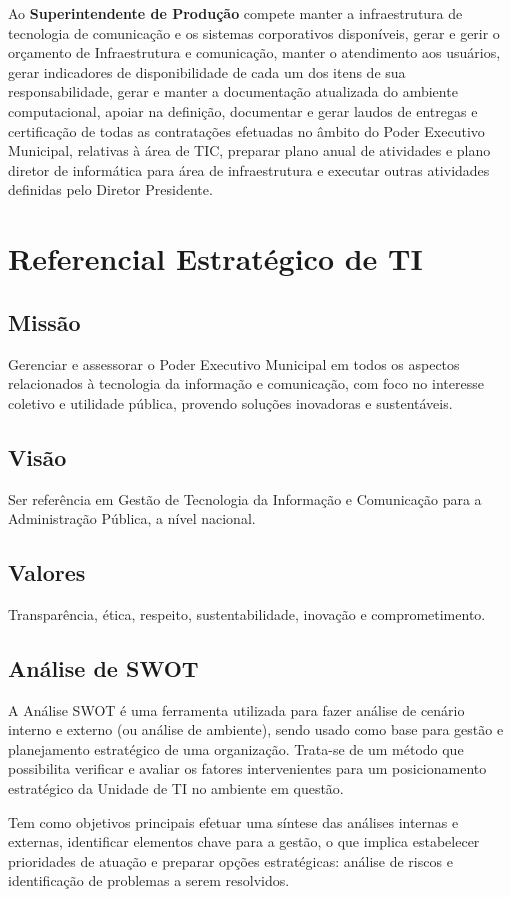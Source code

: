 \documentclass[        
    a4paper,          %
    12pt,             %
    chapter=TITLE,    %
    section=Title,    %
    subsection=Title, %
    oneside,          %
    english,          %
    spanish,          %
    brazil,           %
    sumario=abnt-6027-2012,
]{abntex2}
\begin{document}
Ao \textbf{Superintendente de Produção} compete manter a infraestrutura de tecnologia de comunicação e os sistemas corporativos 
disponíveis, gerar e gerir o orçamento de Infraestrutura e comunicação, manter o atendimento aos usuários, gerar indicadores de 
disponibilidade de cada
um dos itens de sua responsabilidade, gerar e manter a documentação atualizada do ambiente computacional, apoiar na definição, documentar e 
gerar laudos de entregas e certificação de todas as contratações efetuadas no âmbito do Poder Executivo Municipal, relativas à área de TIC,
preparar plano anual de atividades e plano diretor de informática para área de infraestrutura e executar outras atividades definidas pelo 
Diretor Presidente.

\section{Referencial Estratégico de TI}
\subsection{Miss\~ao}
Gerenciar e assessorar o Poder Executivo Municipal em todos os aspectos relacionados à tecnologia da informação e comunicação, com foco no 
interesse coletivo e utilidade pública, provendo soluções inovadoras e sustentáveis.
\subsection{Vis\~ao}
Ser referência em Gestão de Tecnologia da Informação e Comunicação para a Administração Pública, a nível nacional.
\subsection{Valores}
Transparência, ética, respeito, sustentabilidade, inovação e comprometimento.
\subsection{Análise de SWOT}

A Análise SWOT é uma ferramenta utilizada para fazer análise de cenário interno e externo (ou análise de ambiente), sendo usado como base 
para gestão e planejamento estratégico de uma organização. Trata-se de um método que possibilita verificar e avaliar os
fatores intervenientes para um posicionamento estratégico da Unidade de TI no ambiente em questão.

Tem como objetivos principais efetuar uma síntese das análises internas e externas, identificar elementos chave para a gestão, o que 
implica estabelecer prioridades de atuação e preparar opções estratégicas: análise de riscos e identificação de problemas a serem 
resolvidos.
\end{document}
